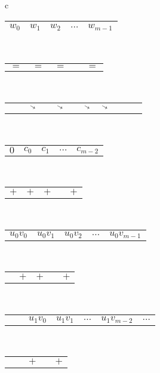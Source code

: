 {
\begin{minipage}{0.5\textwidth}
  \centering
  \begin{figure}[H]
  \centering
  \footnotesize
  \begin{tabular}{c}
    \begin{tabular}{|C{0.8cm}|C{0.8cm}|C{0.8cm}|C{0.5cm}|C{0.8cm}|}
      \hline
      $w_0$ & $w_1$ & $w_2$ & $\ldots$ & $w_{m-1}$\\
      \hline
    \end{tabular}\\
    \begin{tabular}{C{0.8cm}C{0.8cm}C{0.8cm}C{0.5cm}C{0.8cm}}
      $=$ & $=$ & $=$ &  & $=$
    \end{tabular}\\[-2ex]
    \begin{tabular}{C{0.2cm}C{0.2cm}C{0.2cm}C{0.2cm}C{0.2cm}C{0cm}C{0.7cm}C{0.2cm}C{0.2cm}C{0.2cm}C{0.2cm}}
      & & $\diagonalarrowdown$ & & $\diagonalarrowdown$ & & $\diagonalarrowdown$ & $\diagonalarrowdown$ & &
    \end{tabular}\\[-1.4ex]
    \begin{tabular}{C{0.8cm}C{0.8cm}C{0.8cm}C{0.5cm}C{0.8cm}}
      $0$ & $c_0$ & $c_1$ & $\ldots$ & $c_{m-2}$
    \end{tabular}\\[-0.5ex]
    \begin{tabular}{C{0.8cm}C{0.8cm}C{0.8cm}C{0.5cm}C{0.8cm}}
      $+$ & $+$ & $+$ &  & $+$
    \end{tabular}\\[-0.5ex]
    \begin{tabular}{C{0.8cm}C{0.8cm}C{0.8cm}C{0.5cm}C{0.8cm}}
      $u_0 v_0$ & $u_0 v_1$ & $u_0 v_2$ & $\ldots$ & $u_0v_{m-1}$
    \end{tabular}\\[-0.5ex]
    \begin{tabular}{C{0.8cm}C{0.8cm}C{0.8cm}C{0.5cm}C{0.8cm}}
       & $+$ & $+$ &  & $+$
    \end{tabular}\\[-0.5ex]
    \begin{tabular}{C{0cm}C{0.8cm}C{0.8cm}C{0.8cm}C{0.5cm}C{0.8cm}C{0cm}}
       & & $u_1v_0$ & $u_1v_1$ & $\ldots$ & $u_1v_{m-2}$ & $\ldots$
    \end{tabular}\\[-0.5ex]
    \begin{tabular}{C{0.8cm}C{0.8cm}C{0.8cm}C{0.5cm}C{0.8cm}}
       & & $+$ &  & $+$
    \end{tabular}\\[-0.5ex]

\end{tabular}
\end{figure}
\end{minipage}}

